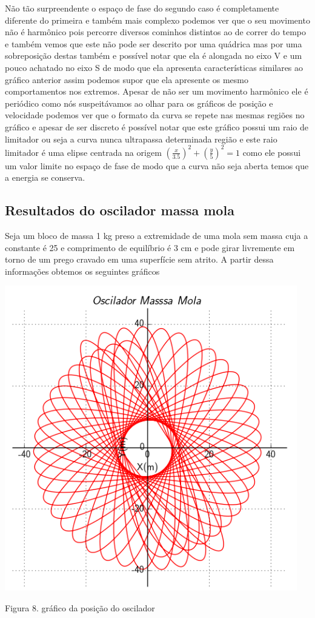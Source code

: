 \documentclass[a4paper]{article} %
\begin{document}
Não tão surpreendente o espaço de fase do segundo caso é completamente diferente do primeira e também mais complexo podemos ver que o seu movimento não é harmônico pois percorre diversos cominhos distintos ao de correr do tempo e também vemos que este não pode ser descrito por uma quádrica mas por uma sobreposição destas também e possível notar que ela é alongada no eixo V e um pouco achatado no eixo S de modo que ela apresenta características similares ao gráfico anterior assim podemos supor que ela apresente os mesmo comportamentos nos extremos. Apesar de não ser um movimento harmônico ele é periódico como nós suspeitávamos ao olhar para os gráficos de posição e velocidade  podemos ver que o formato da curva se repete nas mesmas regiões no gráfico e apesar de ser discreto é possível notar que este gráfico possui um raio de limitador ou seja a curva nunca ultrapassa determinada região e este raio limitador é uma elipse centrada na origem  $ \left(\frac{x}{3.5}\right)^2 +  \left(\frac{y}{5}\right)^2 = 1 $ como ele possui um valor limite no espaço de fase de modo que a curva não seja aberta temos que a energia se conserva.  

\subsection{Resultados do oscilador massa mola}
\noindent

Seja um bloco de massa 1 kg preso a extremidade de uma mola sem massa cuja a constante é 25 e comprimento de equilíbrio é 3 cm e pode girar livremente em torno de um prego cravado em uma superfície sem atrito. A partir dessa informações obtemos os seguintes gráficos 
\vspace{1cm} 
\begin{center}
	\includegraphics[width=5.02in,height=5.24in, keepaspectratio=false]{penMassaMola.png}
	
	\scriptsize {Figura 8. gráfico da posição do oscilador}
\end{center}
\end{document}

